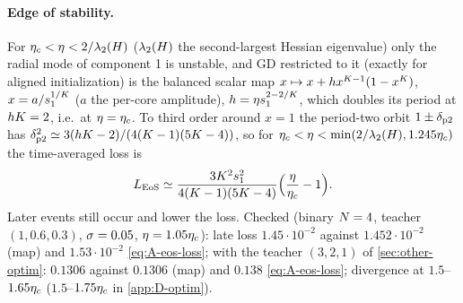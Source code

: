 \paragraph{Edge of stability.} \derived{} \knownresult[edge of stability: \citealp{cohen2021gradient}; the
scalar map and its two-cycle, given implicitly: \citealp{ghosh2025learning}, Thm~1; the amplitude below follows
from the normal form of \citealp{macdonald2025convergence}, Thm~5.3 and Prop.~B.3; $\Kc=2$:
\citealp{hofmann2026map}]  For $\eta_c<\eta<2/\lambda_2(H)$ ($\lambda_2(H)$ the second-largest Hessian eigenvalue) only
the radial mode of component 1 is unstable, and GD
restricted to it (exactly for aligned initialization) is the balanced scalar map
$x\mapsto x+hx^{K-1}(1-x^K)$, $x=a/s_{1}^{1/K}$ ($a$ the per-core amplitude), $h=\eta s_{1}^{2-2/K}$, which doubles
its period at $hK=2$, i.e.\ at $\eta=\eta_c$. To third order around $x=1$ the period-two orbit $1\pm\delta_{\rm p2}$
has $\delta_{\rm p2}^2\simeq3(hK-2)/(4(K-1)(5K-4))$, so for $\eta_c<\eta<\min(2/\lambda_2(H),1.245\eta_c)$ the
time-averaged loss is
\begin{equation}\label{eq:A-eos-loss}
  L_{\rm EoS}\simeq\frac{3K^2s_{1}^2}{4(K-1)(5K-4)}\Big(\frac{\eta}{\eta_c}-1\Big).
\end{equation}
Later events still occur and lower the loss. Checked (binary $N=4$, teacher $(1,0.6,0.3)$, $\sigma=0.05$,
$\eta=1.05\eta_c$): late loss $1.45\cdot10^{-2}$ against $1.452\cdot10^{-2}$ (map) and $1.53\cdot10^{-2}$ \eqref{eq:A-eos-loss};
with the teacher $(3,2,1)$ of \cref{sec:other-optim}: $0.1306$ against $0.1306$ (map) and $0.138$
\eqref{eq:A-eos-loss}; divergence at $1.5$--$1.65\eta_c$ ($1.5$--$1.75\eta_c$ in \cref{app:D-optim}).

